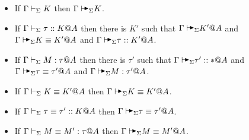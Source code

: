 \begin{theorem}
    \label{theorem:CompletenessofAlgorithmicTyping}
    \begin{itemize}
        \item If \(\Gamma\vdash_\Sigma K \) then \(\G\AVS K \).
        \item If \(\Gamma\vdash_\Sigma \tau ::K @ A \) then there is \(K'\) such that \( \G \AVS K' @ A \) and \( \G \AVS K\E K' @ A \) and \( \G\AVS \tau :: K' @ A \).
        \item If \(\Gamma\vdash_\Sigma M:\tau @ A \) then there is \(\tau'\) such that \( \G \AVS \tau' :: * @ A \) and \( \G \AVS \tau \E \tau' @ A \) and \( \G\AVS M:\tau' @ A \).
        \item If \(\Gamma\vdash_\Sigma K\equiv K' @ A \) then \(\G\AVS K\E K' @ A \).
        \item If \(\Gamma\vdash_\Sigma \tau \equiv \tau' :: K @ A \) then \(\G\AVS \tau \E \tau' @ A \).
        \item If \(\Gamma\vdash_\Sigma M\equiv M' : \tau @ A \) then \(\G \AVS M \E M' @ A \).
    \end{itemize}
\end{theorem}

